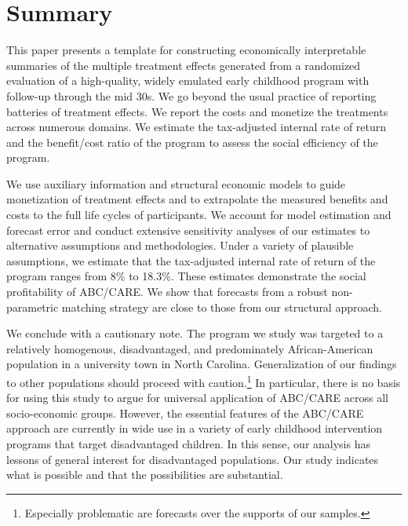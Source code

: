 \section{Summary} \label{section:conclusion}

\noindent This paper presents a template for constructing economically interpretable summaries of the multiple treatment effects generated from a randomized evaluation of a high-quality, widely emulated early childhood program with follow-up through the mid 30s. We go beyond the usual practice of reporting batteries of treatment effects. We report the costs and monetize the treatments across numerous domains. We estimate the tax-adjusted internal rate of return and the benefit/cost ratio of the program to assess the social efficiency of the program.

We use auxiliary information and structural economic models to guide monetization of treatment effects and to extrapolate the measured benefits and costs to the full life cycles of participants. We account for model estimation and forecast error and conduct extensive sensitivity analyses of our estimates to alternative assumptions and methodologies. Under a variety of plausible assumptions, we estimate that the tax-adjusted internal rate of return of the program ranges from 8\% to 18.3\%. These estimates demonstrate the social profitability of ABC/CARE. We show that forecasts from a robust non-parametric matching strategy are close to those from our structural approach. 

We conclude with a cautionary note. The program we study was targeted to a relatively homogenous, disadvantaged, and predominately African-American population in a university town in North Carolina. Generalization of our findings to other populations should proceed with caution.\footnote{Especially problematic are forecasts over the supports of our samples.} In particular, there is no basis for using this study to argue for universal application of ABC/CARE across all socio-economic groups. However, the essential features of the ABC/CARE approach are currently in wide use in a variety of early childhood intervention programs that target disadvantaged children. In this sense, our analysis has lessons of general interest for disadvantaged populations. Our study indicates what is possible and that the possibilities are substantial.

\singlespace






